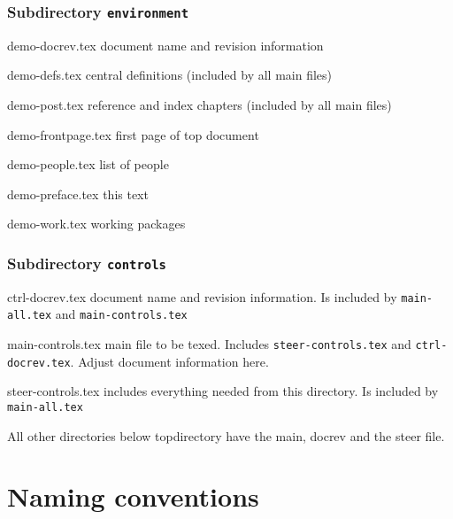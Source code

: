 \subsubsection{Subdirectory {\tt environment}}
\begin{compactdesc}
\item[demo-docrev.tex] document name and revision information
\item[demo-defs.tex] central definitions (included by all main files)
\item[demo-post.tex] reference and index chapters (included by all main files)
\item[demo-frontpage.tex] first page of top document
\item[demo-people.tex] list of people
\item[demo-preface.tex] this text
\item[demo-work.tex] working packages
\end{compactdesc}
\subsubsection{Subdirectory {\tt controls}}
\begin{compactdesc}
\item[ctrl-docrev.tex] document name and revision information.
Is included by {\tt main-all.tex} and {\tt main-controls.tex}
\item[main-controls.tex] main file to be texed.
Includes {\tt steer-controls.tex} and {\tt ctrl-docrev.tex}. Adjust document information here.
\item[steer-controls.tex] includes everything needed from this directory.
Is included by {\tt main-all.tex}
\end{compactdesc}
All other directories below topdirectory have the main, docrev and the steer file.
\section{Naming conventions}
